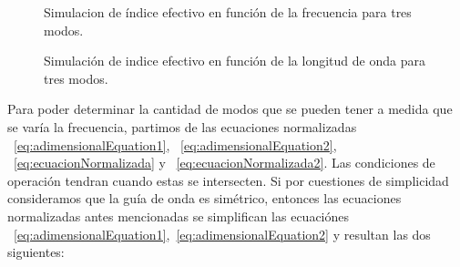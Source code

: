 \documentclass[letterpaper, 10 pt, conference]{ieeeconf}  %
\begin{document}
\begin{figure}[ht!]
\caption{Simulacion de \'indice efectivo en funci\'on de la frecuencia para tres modos.
}\label{fig:FrecuencyAnalisisMode3}
\end{figure}
\begin{figure}[ht!]
\caption{Simulaci\'on de indice efectivo en funci\'on de la longitud de onda para tres modos.
}\label{fig:Mode3Analysis}
\end{figure}
Para poder determinar la cantidad de modos que se pueden tener a medida que se var\'ia la frecuencia, partimos de las ecuaciones normalizadas  ~\eqref{eq:adimensionalEquation1}, ~\eqref{eq:adimensionalEquation2}, ~\eqref{eq:ecuacionNormalizada} y ~\eqref{eq:ecuacionNormalizada2}. Las condiciones de operaci\'on tendran cuando estas se intersecten. Si por cuestiones de simplicidad consideramos que la gu\'ia de onda es sim\'etrico, entonces las  ecuaciones normalizadas antes mencionadas se simplifican  las ecuaci\'ones ~\eqref{eq:adimensionalEquation1},~\eqref{eq:adimensionalEquation2} y resultan las dos siguientes:
\end{document}
